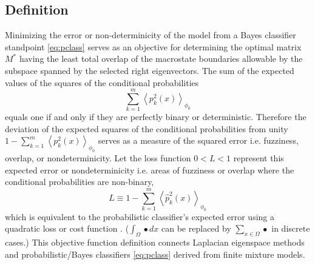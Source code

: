 \documentclass[10pt,letterpaper]{article}
\newcommand{\R}{\mathbb{R}}
\begin{document}
\subsection{Definition}\label{sec:lemmdef}
Minimizing the error or non-determinicity of the model from a Bayes classifier standpoint \eqref{eq:pclass} serves as an objective for determining the optimal matrix $M^{*}$ having the least total overlap of the macrostate boundaries allowable by the subspace spanned by the selected right eigenvectors.
The sum of the expected values of the squares of the conditional probabilities $$\sum_{k = 1}^m \left\langle p^2_k(x) \right\rangle_{\phi_0}$$ equals one if and only if they are perfectly binary or deterministic.
Therefore the deviation of the expected squares of the conditional probabilities from unity $1 - \sum_{k = 1}^m \left\langle p^2_k(x) \right\rangle_{\phi_0}$ serves as a measure of the squared error i.e. fuzziness, overlap, or nondeterminicity.
Let the loss function $0 < L < 1$ represent this expected error or nondeterminicity i.e. areas of fuzziness or overlap where the conditional probabilities are non-binary,
\begin{equation}
L    \equiv 1 - \sum_{k = 1}^m \left\langle \hat p^2_k(x) \right\rangle_{\phi_0} \label{eq:loss}
\end{equation}
which is equivalent to the probabilistic classifier's expected error using a quadratic loss or cost function \cite{bishop}.
($\int_\Omega \bullet dx$ can be replaced by $\sum_{x \in \Omega} \bullet$  in discrete cases.)
This objective function definition connects Laplacian eigenspace methods and probabilistic/Bayes classifiers \eqref{eq:pclass} derived from finite mixture models.
\end{document}
